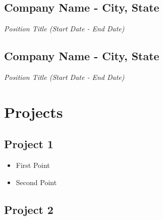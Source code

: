 \documentclass[10pt,letterpaper]{article}
\begin{document}
\subsection{Company Name - City, State}\label{company-name---city-state}

\emph{Position Title (Start Date - End Date)}

\subsection{Company Name - City,
State}\label{company-name---city-state-1}

\emph{Position Title (Start Date - End Date)}

\section{Projects}\label{projects}

\subsection{Project 1}\label{project-1}

\begin{itemize}
\item
  First Point
\item
  Second Point
\end{itemize}

\subsection{Project 2}\label{project-2}

\end{document}
